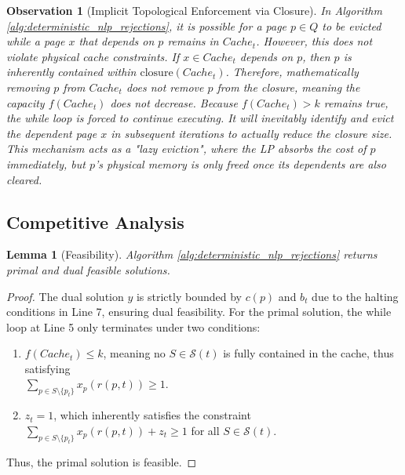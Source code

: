 \documentclass[a4paper]{article}
\newtheorem{lemma}{Lemma}      %
\newtheorem{observation}{Observation} %
\begin{document}
\begin{observation}[Implicit Topological Enforcement via Closure]
\label{obs:closure_cascading}
In Algorithm \ref{alg:deterministic_nlp_rejections}, it is possible for a page $p \in Q$ to be evicted while a page $x$ that depends on $p$ remains in $Cache_t$. However, this does not violate physical cache constraints. If $x \in Cache_t$ depends on $p$, then $p$ is inherently contained within $\text{closure}(Cache_t)$. Therefore, mathematically removing $p$ from $Cache_t$ does not remove $p$ from the closure, meaning the capacity $f(Cache_t)$ does not decrease. Because $f(Cache_t) > k$ remains true, the while loop is forced to continue executing. It will inevitably identify and evict the dependent page $x$ in subsequent iterations to actually reduce the closure size. This mechanism acts as a "lazy eviction", where the LP absorbs the cost of $p$ immediately, but $p$'s physical memory is only freed once its dependents are also cleared.
\end{observation}

\subsection{Competitive Analysis}

\begin{lemma}[Feasibility]
\label{lemma:feasibility_rejections}
Algorithm \ref{alg:deterministic_nlp_rejections} returns primal and dual feasible solutions.
\end{lemma}
\begin{proof}
The dual solution $y$ is strictly bounded by $c(p)$ and $b_t$ due to the halting conditions in Line 7, ensuring dual feasibility. For the primal solution, the while loop at Line 5 only terminates under two conditions:
\begin{enumerate}
    \item $f(Cache_t) \le k$, meaning no $S \in \mathcal{S}(t)$ is fully contained in the cache, thus satisfying \\ $\sum_{p \in S \setminus \{p_t\}} x_p(r(p,t)) \ge 1$.
    \item $z_t = 1$, which inherently satisfies the constraint $\sum_{p \in S \setminus \{p_t\}} x_p(r(p,t)) + z_t \ge 1$ for all $S \in \mathcal{S}(t)$.
\end{enumerate}
Thus, the primal solution is feasible.
\end{proof}
\end{document}
